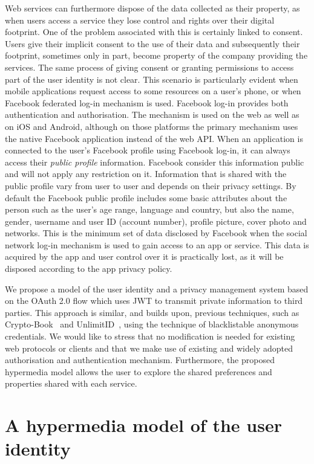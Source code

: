 Web services can furthermore dispose of the data collected as their property, as when users access a service they lose control and rights over their digital footprint. One of the problem associated with this is certainly linked to consent. Users give their implicit consent to the use of their data and subsequently their footprint, sometimes only in part, become property of the company providing the services. The same process of giving consent or granting permissions to access part of the user identity is not clear. This scenario is particularly evident when mobile applications request access to some resources on a user's phone, or when Facebook federated log-in mechanism is used. Facebook log-in provides both authentication and authorisation. The mechanism is used on the web as well as on iOS and Android, although on those platforms the primary mechanism uses the native Facebook application instead of the web API. When an application is connected to the user's Facebook profile using Facebook log-in, it can always access their \emph{public profile} information. Facebook consider this information public and will not apply any restriction on it. Information that is shared with the public profile vary from user to user and depends on their privacy settings. By default the Facebook public profile includes some basic attributes about the person such as the user's age range, language and country, but also the name, gender, username and user ID (account number), profile picture, cover photo and networks. This is the minimum set of data disclosed by Facebook when the social network log-in mechanism is used to gain access to an app or service. This data is acquired by the app and user control over it is practically lost, as it will be disposed according to the app privacy policy.

We propose a model of the user identity and a privacy management system based on the OAuth 2.0 flow which uses JWT to transmit private information to third parties. This approach is similar, and builds upon, previous techniques, such as Crypto-Book~\cite{maheswaran2013crypto} and UnlimitID~\cite{isaakidis2016unlimitid}, using the technique of blacklistable anonymous credentials. We would like to stress that no modification is needed for existing web protocols or clients and that we make use of existing and widely adopted authorisation and authentication mechanism. Furthermore, the proposed hypermedia model allows the user to explore the shared preferences and properties shared with each service.

\section{A hypermedia model of the user identity}

